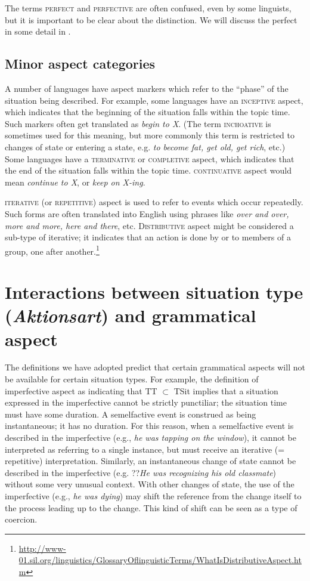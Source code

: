 The terms \textsc{perfect} and \textsc{perfective} are often confused, even by some linguists, but it is important to be clear about the distinction. We will discuss the perfect in some detail in .


\subsection{Minor aspect categories}\label{sec:20.4.4}

A number of languages have aspect markers which refer to the “phase” of the situation being described. For example, some languages have an \textsc{inceptive} aspect, which indicates that the beginning of the situation falls within the topic time. Such markers often get translated as \textit{begin to X}. (The term \textsc{inchoative} is sometimes used for this meaning, but more commonly this term is restricted to changes of state or entering a state, e.g. \textit{to become fat, get old, get rich}, etc.) Some languages have a \textsc{terminative} or \textsc{completive} aspect, which indicates that the end of the situation falls within the topic time. \textsc{continuative} aspect would mean \textit{continue to X}, or \textit{keep on X-ing}.



\textsc{iterative} (or \textsc{repetitive}) aspect is used to refer to events which occur repeatedly. Such forms are often translated into English using phrases like \textit{over and over, more and more, here and there}, etc. \textsc{Distributive} aspect might be considered a sub-type of iterative; it indicates that an action is done by or to members of a group, one after another.\footnote{\url{http://www-01.sil.org/linguistics/GlossaryOflinguisticTerms/WhatIsDistributiveAspect.htm}} 


\section{Interactions between situation type (\textit{Aktionsart}) and grammatical aspect}\label{sec:20.5}

The definitions we have adopted predict that certain grammatical aspects will not be available for certain situation types. For example, the definition of imperfective aspect as indicating that TT ${\subset}$ TSit implies that a situation expressed in the imperfective cannot be strictly punctiliar; the situation time must have some duration. A semelfactive event is construed as being instantaneous; it has no duration. For this reason, when a semelfactive event is described in the imperfective (e.g., \textit{he was tapping on the window}), it cannot be interpreted as referring to a single instance, but must receive an iterative (= repetitive) interpretation. Similarly, an instantaneous change of state cannot be described in the imperfective (e.g. ??\textit{He was recognizing his old classmate}) without some very unusual context. With other changes of state, the use of the imperfective (e.g., \textit{he was dying}) may shift the reference from the change itself to the process leading up to the change. This kind of shift can be seen as a type of coercion.



